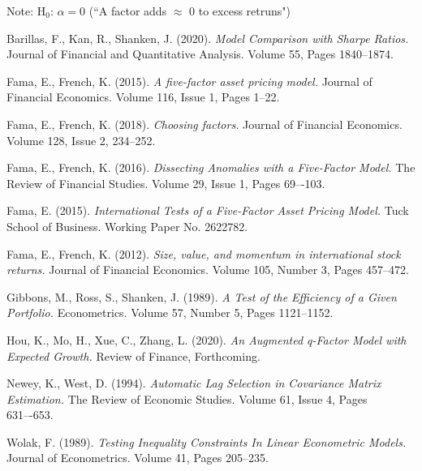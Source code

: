 \documentclass[11pt, english]{article}
\begin{document}
Note: $\mathrm{H_0}$: $\alpha=0$ (``A factor adds $\approx$ 0 to excess retruns")

\newpage

\renewcommand\refname{Bibliography}

\begin{thebibliography}{9}

		Barillas, F., Kan, R., Shanken, J. (2020).
		\textsl{Model Comparison with Sharpe Ratios.}
		Journal of Financial and Quantitative Analysis. Volume 55, Pages 1840--1874.

		Fama, E., French, K. (2015).
		\textsl{A five-factor asset pricing model.}
		Journal of Financial Economics. Volume 116, Issue 1, Pages 1--22.

		Fama, E., French, K. (2018).
		\textsl{Choosing factors.}
		Journal of Financial Economics. Volume 128, Issue 2, 234--252.

		Fama, E., French, K. (2016).
		\textsl{Dissecting Anomalies with a Five-Factor Model.}
		The Review of Financial Studies. Volume 29, Issue 1, Pages 69–-103.

		Fama, E. (2015).
		\textsl{International Tests of a Five-Factor Asset Pricing Model.}
		Tuck School of Business. Working Paper No. 2622782.
	
		Fama, E., French, K. (2012).
		\textsl{Size, value, and momentum in international stock returns.}
		Journal of Financial Economics. Volume 105, Number 3, Pages 457--472.

		Gibbons, M., Ross, S., Shanken, J. (1989).
		\textsl{A Test of the Efficiency of a Given Portfolio.}
		Econometrics. Volume 57, Number 5, Pages 1121--1152.
	
		Hou, K., Mo, H., Xue, C., Zhang, L. (2020).
		\textsl{An Augmented q-Factor Model with Expected Growth.}
		Review of Finance, Forthcoming.
	
		Newey, K., West, D. (1994).
		\textsl{Automatic Lag Selection in Covariance Matrix Estimation.}
		The Review of Economic Studies. Volume 61, Issue 4, Pages 631–-653.

		Wolak, F. (1989).
		\textsl{Testing Inequality Constraints In Linear Econometric Models.}
		Journal of Econometrics. Volume 41, Pages 205--235.

\end{thebibliography}
\end{document}
